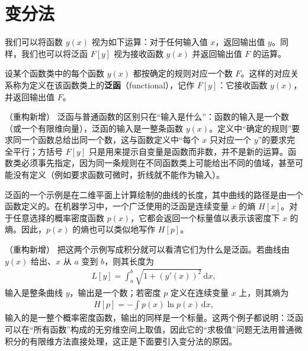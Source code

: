 \documentclass[../main.tex]{subfiles}
\begin{document}

\chapter{变分法}\label{chapter:appB-变分法}

我们可以将函数 $y(x)$ 视为如下运算：对于任何输入值 $x$，返回输出值 $y$。同样，我们也可以将泛函 $F[y]$ 视为接收函数 $y(x)$ 并返回输出值 $F$ 的运算。

\begin{definition}[泛函]\label{definition:appB-泛函}
设某个函数类中的每个函数 $y(x)$ 都按确定的规则对应一个数 $F$。这样的对应关系称为定义在该函数类上的\textbf{泛函}（functional），记作 $F[y]$：它接收函数 $y(x)$，并返回输出值 $F$。
\end{definition}

\begin{remark}（重构新增）
泛函与普通函数的区别只在“输入是什么”：函数的输入是一个数（或一个有限维向量），泛函的输入是一整条函数 $y(x)$。定义中“确定的规则”要求同一个函数总给出同一个数，这与函数定义中“每个 $x$ 只对应一个 $y$”的要求完全平行；方括号 $F[y]$ 只是用来提示自变量是函数而非数，并不是新的运算。函数类必须事先指定，因为同一条规则在不同函数类上可能给出不同的值域，甚至可能没有定义（例如要求函数可微时，折线就不能作为输入）。
\end{remark}

泛函的一个示例是在二维平面上计算绘制的曲线的长度，其中曲线的路径是由一个函数定义的。在机器学习中，一个广泛使用的泛函是连续变量 $x$ 的熵 $H[x]$。对于任意选择的概率密度函数 $p(x)$，它都会返回一个标量值以表示该密度下 $x$ 的熵。因此，$p(x)$ 的熵也可以类似地写作 $H[p]$。

\begin{remark}（重构新增）
把这两个示例写成积分就可以看清它们为什么是泛函。若曲线由 $y(x)$ 给出、$x$ 从 $a$ 变到 $b$，则其长度为
\begin{align*}
  L[y]=\int_{a}^{b}\sqrt{1+(y'(x))^{2}}\,\mathrm{d}x,
\end{align*}
输入是整条曲线 $y$，输出是一个数；若密度 $p$ 定义在连续变量 $x$ 上，则其熵为
\begin{align*}
  H[p]=-\int p(x)\ln p(x)\,\mathrm{d}x,
\end{align*}
输入的是一整个概率密度函数，输出的同样是一个标量。这两个例子都说明：泛函可以在“所有函数”构成的无穷维空间上取值，因此它的“求极值”问题无法用普通微积分的有限维方法直接处理，这正是下面要引入变分法的原因。
\end{remark}
\end{document}
